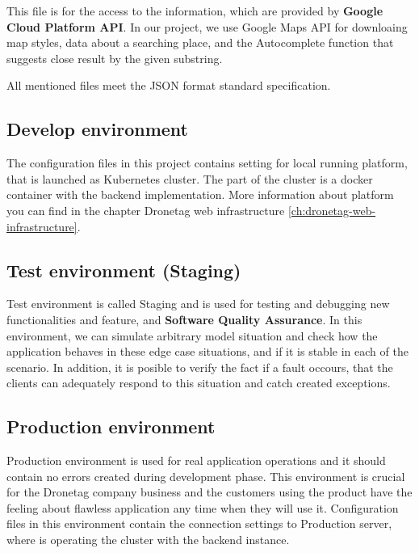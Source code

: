 This file is for the access to the information, which are provided by \textbf{Google Cloud Platform API}.
In our project, we use Google Maps API for downloaing map styles, data about a searching place, and the Autocomplete function that suggests close result by the given substring.

All mentioned files meet the JSON format standard specification.


\subsection{Develop environment}\label{subsec:develop-environment}
The configuration files in this project contains setting for local running platform, that is launched as Kubernetes cluster.
The part of the cluster is a docker container with the backend implementation.
More information about platform you can find in the chapter Dronetag web infrastructure \ref{ch:dronetag-web-infrastructure}.


\subsection{Test environment (Staging)}\label{subsec:test-environment}
Test environment is called Staging and is used for testing and debugging new functionalities and feature, and \textbf{Software Quality Assurance}.\cite{sqa}
In this environment, we can simulate arbitrary model situation and check how the application behaves in these edge case situations, and if it is stable in each of the scenario.
In addition, it is posible to verify the fact if a fault occours, that the clients can adequately respond to this situation and catch created exceptions.


\subsection{Production environment}\label{subsec:production-environment}
Production environment is used for real application operations and it should contain no errors created during development phase.
This environment is crucial for the Dronetag company business and the customers using the product have the feeling about flawless application any time when they will use it.
Configuration files in this environment contain the connection settings to Production server, where is operating the cluster with the backend instance.

